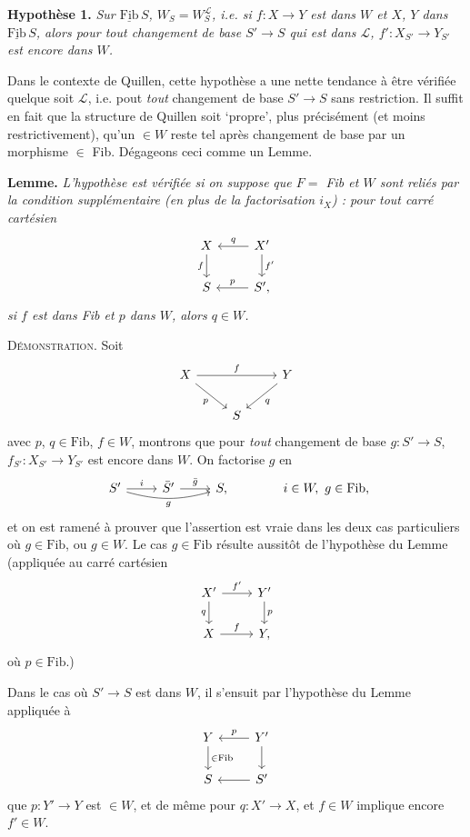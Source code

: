 \documentclass[11pt]{article}
\newcommand{\printedpage}[1]{\marginpar{\footnotesize p.~#1}}
\newcommand{\msp}[1]{\marginpar{\footnotesize [#1]}}
\newcommand{\Fibu}{\underline{\mathrm{Fib}}\,}
\newcommand{\WL}{W_S^{\mathcal{L}}}
\begin{document}
\textbf{Hypothèse 1.} \textit{Sur $\Fibu S$, $W_S = \WL$, i.e. si $f : X \longrightarrow Y$ est dans $W$ et $X$, $Y$ dans $\Fibu S$, alors pour tout changement de base $S' \longrightarrow S$ qui est dans $\mathcal{L}$, $f' : X_{S'} \longrightarrow Y_{S'}$ est encore dans $W$.}

Dans le contexte de Quillen, cette hypothèse a une nette tendance à être vérifiée quelque soit $\mathcal{L}$, i.e. pout \textit{tout} changement de base $S' \longrightarrow S$ sans restriction. Il suffit en fait que la structure de Quillen soit `propre', plus précisément (et moins restrictivement), qu'un $\in W$ reste tel après changement de base par un morphisme $\in$ Fib. Dégageons ceci comme un Lemme. %

\textbf{Lemme.} \textit{L'hypothèse est vérifiée si on suppose} \msp{page 96} \textit{que $F =$ Fib et $W$ sont reliés par la condition supplémentaire (en plus de la factorisation $i_X$) : pour tout carré cartésien}
\[
\begin{tikzcd}
X \arrow[d, "f"'] & X' \arrow[l, "q"'] \arrow[d, "f'"] \\
S & S', \arrow[l, "p"']
\end{tikzcd}
\]
\textit{si $f$ est dans Fib et $p$ dans $W$, alors $q \in W$.}

\textsc{Démonstration}. Soit
\[
\begin{tikzcd}
X \arrow[rr, "f"] \arrow[dr, "p"'] & & Y \arrow[dl, "q"] \\
& S &
\end{tikzcd}
\]
avec $p$, $q \in \mathrm{Fib}$, $f \in W$, montrons que pour \textit{tout} changement de base $g : S' \longrightarrow S$, $f_{S'} : X_{S'} \longrightarrow Y_{S'}$ est encore dans $W$. On factorise $g$ en
\[
\begin{tikzcd}
S' \arrow[r, "i"] \arrow[rr, bend right=15, "g"'] & \bar{S}' \arrow[r, "\bar{g}"] & S,
\end{tikzcd}
\qquad\qquad i \in W,\ g \in \mathrm{Fib},
\]
 et on est ramené à prouver que l'assertion est vraie dans les deux cas particuliers où $g \in \mathrm{Fib}$, ou $g \in W$. Le cas $g \in \mathrm{Fib}$ résulte aussitôt de l'hypothèse du Lemme (appliquée au carré cartésien
\[
\begin{tikzcd}
X' \arrow[r, "f'"] \arrow[d, "q"'] & Y' \arrow[d, "p"] \\
X \arrow[r, "f"] & Y,
\end{tikzcd}
\]
\printedpage{61}
où $p \in \mathrm{Fib}$.)

Dans le cas où $S' \longrightarrow S$ est dans $W$, il s'ensuit par l'hypothèse du Lemme appliquée à
\[
\begin{tikzcd}
Y \arrow[d, "\in\mathrm{Fib}"] & Y' \arrow[l, "p"'] \arrow[d] \\
S & S' \arrow[l]
\end{tikzcd}
\]
que \msp{page 97} $p : Y' \longrightarrow Y$ est $\in W$, et de même pour $q : X' \longrightarrow X$, et $f \in W$ implique encore $f' \in W$.
\end{document}
